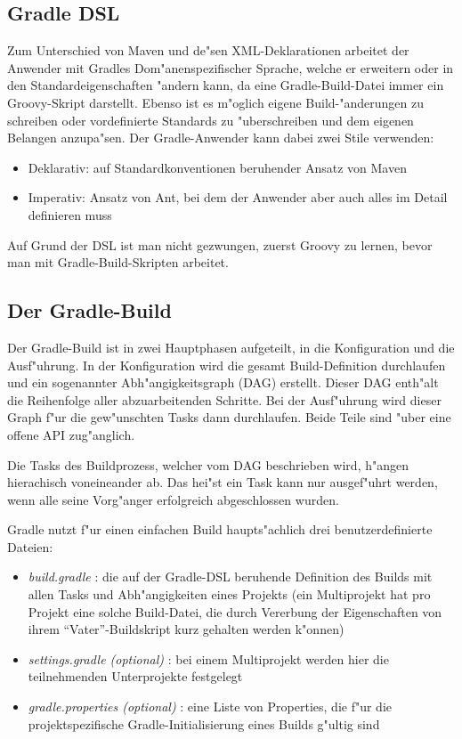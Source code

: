 \subsection{Gradle DSL}
Zum Unterschied von Maven und de"sen XML-Deklarationen arbeitet der Anwender mit Gradles Dom"anenspezifischer Sprache, welche er erweitern oder in den Standardeigenschaften "andern kann, da eine Gradle-Build-Datei immer ein Groovy-Skript darstellt.
Ebenso ist es m"oglich eigene Build-"anderungen zu schreiben oder vordefinierte Standards zu "uberschreiben und dem eigenen Belangen anzupa"sen.
Der Gradle-Anwender kann dabei zwei Stile verwenden:
\begin{itemize}
	\item Deklarativ: auf Standardkonventionen beruhender Ansatz von Maven 
	\item Imperativ: Ansatz von Ant, bei dem der Anwender aber auch alles im Detail definieren muss
\end{itemize}
Auf Grund der DSL ist man nicht gezwungen, zuerst Groovy zu lernen, bevor man mit Gradle-Build-Skripten arbeitet.

\subsection{Der Gradle-Build}
Der Gradle-Build ist in zwei Hauptphasen aufgeteilt, in die Konfiguration und die Ausf"uhrung.
In der Konfiguration wird die gesamt Build-Definition durchlaufen und ein sogenannter Abh"angigkeitsgraph (DAG) erstellt.
Dieser DAG enth"alt die Reihenfolge aller abzuarbeitenden Schritte. Bei der Ausf"uhrung wird dieser Graph f"ur die gew"unschten Tasks dann durchlaufen.
Beide Teile sind "uber eine offene API zug"anglich.

Die Tasks des Buildprozess, welcher vom DAG beschrieben wird, h"angen hierachisch voneineander ab. Das hei"st ein Task kann nur ausgef"uhrt werden, wenn alle seine Vorg"anger erfolgreich abgeschlossen wurden.

Gradle nutzt f"ur einen einfachen Build haupts"achlich drei benutzerdefinierte Dateien:
\begin{itemize}
	\item \textit{build.gradle} : die auf der Gradle-DSL beruhende Definition des Builds mit allen Tasks und Abh"angigkeiten eines Projekts (ein Multiprojekt hat pro Projekt eine solche Build-Datei, die durch Vererbung der Eigenschaften von ihrem ``Vater''-Buildskript kurz gehalten werden k"onnen)
    \item \textit{settings.gradle (optional)} : bei einem Multiprojekt werden hier die teilnehmenden Unterprojekte festgelegt
    \item \textit{gradle.properties (optional)} : eine Liste von Properties, die f"ur die projektspezifische Gradle-Initialisierung eines Builds g"ultig sind
\end{itemize}

